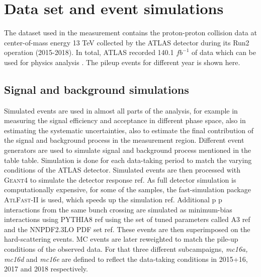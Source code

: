 \section{Data set and event simulations}
\label{sec:data-and-mc-simulations}

The dataset used in the measurement contains the proton-proton collision data at center-of-mass energy 13 TeV collected by the ATLAS detector during its Run2 operation (2015-2018). In total, ATLAS recorded 140.1 $fb^{-1}$ of data which can be used for physics analysis \cite{Aad_2020}. The pileup events for different year is shown here.



\subsection{Signal and background simulations}
Simulated events are used in almost all parts of the analysis, for example in measuring the signal efficiency and acceptance in different phase space, also in estimating the systematic uncertainties, also to estimate the final contribution of the signal and background process in the measurement region. Different event generators are used to simulate signal and background process mentioned in the table {table}. Simulation is done for each data-taking period to match the varying conditions of the ATLAS detector.
Simulated events are then processed with \textsc{Geant4} to simulate the detector response {ref}. As full detector simulation is computationally expensive, for some of the samples, the fast-simulation package \textsc{AtlFast-II} is used, which speeds up the simulation {ref}. Additional p p interactions from the same bunch crossing are simulated as minimum-bias interactions using PYTHIA8 {ref} using the set of tuned parameters called A3 {ref} and the NNPDF2.3LO PDF set {ref}. These events are then superimposed on the hard-scattering events. MC events are later reweighted to match the pile-up conditions of the observed data. For that three different subcampaigns, \textit{mc16a, mc16d} and \textit{mc16e} are defined to reflect the data-taking conditions in 2015+16, 2017 and 2018 respectively.

